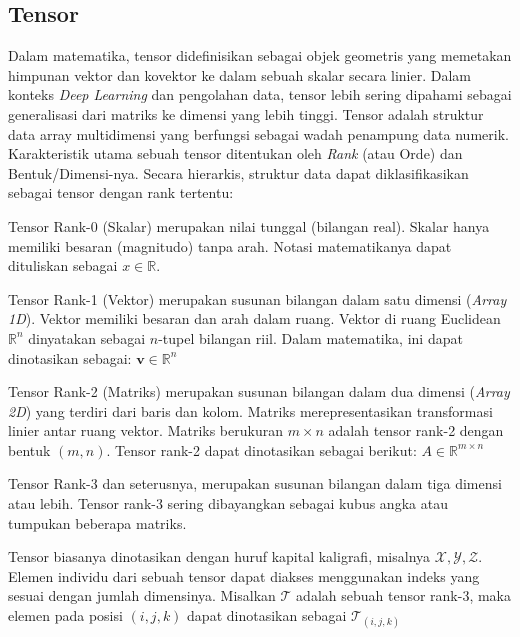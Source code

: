 \subsection{Tensor}
Dalam matematika, tensor didefinisikan sebagai objek geometris yang memetakan himpunan vektor dan kovektor ke dalam sebuah skalar secara linier. Dalam konteks \textit{Deep Learning} dan pengolahan data, tensor lebih sering dipahami sebagai generalisasi dari matriks ke dimensi yang lebih tinggi. Tensor adalah struktur data array multidimensi yang berfungsi sebagai wadah penampung data numerik. Karakteristik utama sebuah tensor ditentukan oleh \textit{Rank} (atau Orde) dan Bentuk/Dimensi-nya.
Secara hierarkis, struktur data dapat diklasifikasikan sebagai tensor dengan rank tertentu:
\begin{IEEEitemize}
    \item Tensor Rank-0 (Skalar) merupakan nilai tunggal (bilangan real). 
        Skalar hanya memiliki besaran (magnitudo) tanpa arah. Notasi matematikanya dapat dituliskan sebagai $x \in \mathbb{R}$.
    \item Tensor Rank-1 (Vektor) merupakan susunan bilangan dalam satu dimensi (\textit{Array 1D}). Vektor memiliki besaran dan arah dalam ruang. 
        Vektor di ruang Euclidean $\mathbb{R}^n$ dinyatakan sebagai $n$-tupel bilangan riil. Dalam matematika, ini dapat dinotasikan sebagai: $\mathbf{v} \in \mathbb{R}^n$
    \item Tensor Rank-2 (Matriks) merupakan susunan bilangan dalam dua dimensi (\textit{Array 2D}) yang terdiri dari baris dan kolom. Matriks merepresentasikan transformasi linier antar ruang vektor. 
        Matriks berukuran $m \times n$ adalah tensor rank-2 dengan bentuk $(m, n)$. Tensor rank-2 dapat dinotasikan sebagai berikut: $A \in \mathbb{R}^{m\times n}$

    \item Tensor Rank-3 dan seterusnya, merupakan susunan bilangan dalam tiga dimensi atau lebih. 
        Tensor rank-3 sering dibayangkan sebagai kubus angka atau tumpukan beberapa matriks. 
\end{IEEEitemize}

Tensor biasanya dinotasikan dengan huruf kapital kaligrafi, misalnya $\mathcal{X}, \mathcal{Y}, \mathcal{Z}$.
Elemen individu dari sebuah tensor dapat diakses menggunakan indeks yang sesuai dengan jumlah dimensinya.
Misalkan $\mathcal{T}$ adalah sebuah tensor rank-3, maka elemen pada posisi $(i, j, k)$ dapat dinotasikan sebagai
$\mathcal{T}_{(i, j, k)}$

